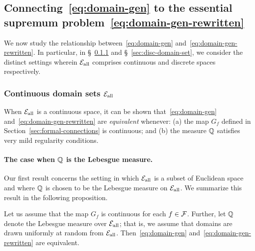 \documentclass{article}
\begin{document}
%
%
%
%
%
%
%
%
%
%
%

\subsection{Connecting~\texorpdfstring{\eqref{eq:domain-gen}}{DG} to the essential supremum problem~\texorpdfstring{\eqref{eq:domain-gen-rewritten}}{3.1}} \label{sec:sup-and-esssup-connections}

We now study the relationship between~\eqref{eq:domain-gen} and~\eqref{eq:domain-gen-rewritten}. In particular, in \S~\ref{sec:cont-domain-sets} and \S~\ref{sec:disc-domain-set}, we consider the distinct settings wherein ${\mathcal{E}_\text{all}}$ comprises continuous and discrete spaces respectively. 

\subsubsection{Continuous domain sets \texorpdfstring{${\mathcal{E}_\text{all}}$}{E}} \label{sec:cont-domain-sets}

When ${\mathcal{E}_\text{all}}$ is a continuous space, it can be shown that~\eqref{eq:domain-gen} and~\eqref{eq:domain-gen-rewritten} are \emph{equivalent} whenever: (a) the map $G_f$ defined in Section~\ref{sec:formal-connections} is continuous; and (b) the measure $\mathbb{Q}$ satisfies very mild regularity conditions.  

\paragraph{The case when $\mathbb{Q}$ is the Lebesgue measure.}  Our first result concerns the setting in which ${\mathcal{E}_\text{all}}$ is a subset of Euclidean space and where $\mathbb{Q}$ is chosen to be the Lebesgue measure on ${\mathcal{E}_\text{all}}$.  We summarize this result in the following proposition.

\begin{proposition} \label{prop:cont-equivalent-of-dg}
Let us assume that the map $G_f$ is continuous for each $f\in\mathcal{F}$.  Further, let $\mathbb{Q}$ denote the Lebesgue measure over ${\mathcal{E}_\text{all}}$; that is, we assume that domains are drawn uniformly at random from ${\mathcal{E}_\text{all}}$. Then~\eqref{eq:domain-gen} and~\eqref{eq:domain-gen-rewritten} are equivalent.
\end{proposition}
\end{document}
